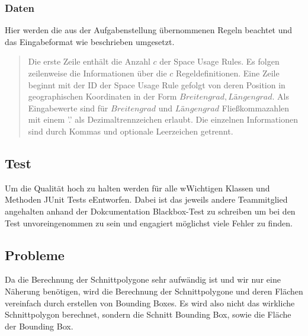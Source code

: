 \subsubsection{Daten}
\label{sec:Eingabedaten_GI}
Hier werden die aus der Aufgabenstellung übernommenen Regeln beachtet und das Eingabeformat wie beschrieben umgesetzt.
\begin{quote}
Die erste Zeile enthält die Anzahl $c$ der Space Usage Rules. Es folgen zeilenweise die Informationen
über die $c$ Regeldefinitionen.
Eine Zeile beginnt mit der ID der Space Usage Rule gefolgt von deren Position in geographischen
Koordinaten in der Form $Breitengrad, Längengrad$. Als Eingabewerte sind für $Breitengrad$ und
$Längengrad$ Fließkommazahlen mit einem ’.’ als Dezimaltrennzeichen erlaubt. Die einzelnen Informationen
sind durch Kommas und optionale Leerzeichen getrennt.
\end{quote}

\subsection{Test}
Um die Qualität hoch zu halten werden für alle wWichtigen Klassen und Methoden JUnit Tests
eEntworfen. Dabei ist das jeweils andere Teammitglied angehalten anhand der Dokcumentation Blackbox-Test zu 
schreiben um bei den Test unvoreingenommen zu sein und engagiert möglichst viele Fehler zu finden.



\subsection{Probleme}
Da die Berechnung der Schnittpolygone sehr aufwändig ist und wir nur eine Näherung benötigen,
wird die Berechnung der Schnittpolygone und deren Flächen vereinfach durch erstellen von Bounding Boxes.
Es wird also nicht das wirkliche Schnittpolygon berechnet, sondern die Schnitt Bounding Box, sowie die Fläche der Bounding Box.